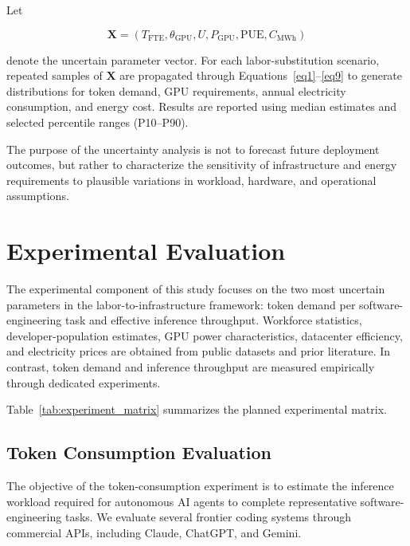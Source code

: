 \documentclass{article}
\begin{document}
Let

\begin{equation}
\mathbf{X}
=
\left(
T_{\mathrm{FTE}},
\theta_{\mathrm{GPU}},
U,
P_{\mathrm{GPU}},
\mathrm{PUE},
C_{\mathrm{MWh}}
\right)
\end{equation}

denote the uncertain parameter vector. For each labor-substitution scenario, repeated samples of $\mathbf{X}$ are propagated through Equations~\ref{eq1}--\ref{eq9} to generate distributions for token demand, GPU requirements, annual electricity consumption, and energy cost. Results are reported using median estimates and selected percentile ranges (P10--P90).

The purpose of the uncertainty analysis is not to forecast future deployment outcomes, but rather to characterize the sensitivity of infrastructure and energy requirements to plausible variations in workload, hardware, and operational assumptions.


\section{Experimental Evaluation}
\label{sec:experiment}

The experimental component of this study focuses on the two most uncertain parameters in the labor-to-infrastructure framework: token demand per software-engineering task and effective inference throughput. Workforce statistics, developer-population estimates, GPU power characteristics, datacenter efficiency, and electricity prices are obtained from public datasets and prior literature. In contrast, token demand and inference throughput are measured empirically through dedicated experiments.

Table~\ref{tab:experiment_matrix} summarizes the planned experimental matrix.

\subsection{Token Consumption Evaluation}

The objective of the token-consumption experiment is to estimate the inference workload required for autonomous AI agents to complete representative software-engineering tasks. We evaluate several frontier coding systems through commercial APIs, including Claude, ChatGPT, and Gemini.
\end{document}
